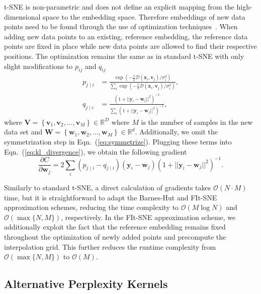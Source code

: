 \documentclass[twocolumn]{bmcart}
\begin{document}
t-SNE is non-parametric and does not define an explicit mapping from the
high-dimensional space to the embedding space. Therefore embeddings of new data
points need to be found through the use of optimization
techniques~\cite{policar2019embedding}. When adding new data points to an
existing, reference embedding, the reference data points are fixed in place
while new data points are allowed to find their respective positions. The
optimization remains the same as in standard t-SNE with only slight
modifications to $p_{ij}$ and $q_{ij}$
\begin{align}
p_{j \mid i} &= \frac{\exp \left ( -\frac{1}{2} \mathcal{D}(\mathbf{x}_i, \mathbf{v}_j) /  \sigma_i^2 \right )}{\sum_{i} \exp \left ( -\frac{1}{2} \mathcal{D}(\mathbf{x}_i, \mathbf{v}_j) / \sigma_i^2 \right )}, \\
q_{j \mid i} &= \frac{\left ( 1 + || \mathbf{y}_i - \mathbf{w}_j ||^2 \right )^{-1}}{\sum_{i}\left ( 1 + || \mathbf{y}_i - \mathbf{w}_j ||^2 \right )^{-1}},
\end{align}
\noindent where $\mathbf{V} = \left \{ \mathbf{v}_1, \mathbf{v}_2, \dots,
\mathbf{v}_M \right \} \in \mathbb{R}^D$ where $M$ is the number of samples in
the new data set and $\mathbf{W} = \left \{ \mathbf{w}_1, \mathbf{w}_2, \dots,
\mathbf{w}_M \right \} \in \mathbb{R}^d$. Additionally, we omit the
symmetrization step in Eqn.~(\ref{eq:symmetrize}). Plugging these terms into
Eqn.~(\ref{eq:kl_divergence}), we obtain the following gradient
\begin{equation}
\frac{\partial C}{\partial \mathbf{w}_j} = 2 \sum_i \left ( p_{j \mid i} - q_{j \mid i} \right ) \left ( \mathbf{y}_i - \mathbf{w}_j \right ) \left ( 1 + || \mathbf{y}_i - \mathbf{w}_j || ^2 \right )^{-1}.
\label{eq:gradient}
\end{equation}

Similarly to standard t-SNE, a direct calculation of gradients takes
$\mathcal{O}(N \cdot M)$ time, but it is straightforward to adapt the Barnes-Hut
and FIt-SNE approximation schemes, reducing the time complexity to
$\mathcal{O}(M \log N)$ and $\mathcal{O}(\max \{ N, M \})$, respectively. In the
FIt-SNE approximation scheme, we additionally exploit the fact that the
reference embedding remains fixed throughout the optimization of newly added
points and precompute the interpolation grid. This further reduces the runtime
complexity from $\mathcal{O}(\max \{ N, M \})$ to $\mathcal{O}(M)$.

\subsection*{Alternative Perplexity Kernels}
\end{document}
